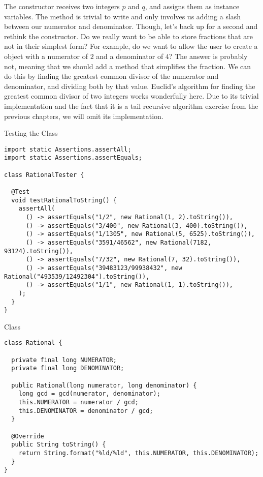 The  constructor receives two integers $p$ and $q$, and assigns them as instance variables. The  method is trivial to write and only involves us adding a slash between our numerator and denominator. Though, let's back up for a second and rethink the constructor. Do we really want to be able to store fractions that are not in their simplest form? For example, do we want to allow the user to create a  object with a numerator of $2$ and a denominator of $4$? The answer is probably not, meaning that we should add a method that simplifies the fraction. We can do this by finding the greatest common divisor of the numerator and denominator, and dividing both by that value. Euclid's algorithm for finding the greatest common divisor of two integers works wonderfully here. Due to its trivial implementation and the fact that it is a tail recursive algorithm exercise from the previous chapters, we will omit its implementation.

\begin{cl}{Testing the  Class}
\begin{lstlisting}[language=MyJava]
import static Assertions.assertAll;
import static Assertions.assertEquals;

class RationalTester {
  
  @Test
  void testRationalToString() {
    assertAll(
      () -> assertEquals("1/2", new Rational(1, 2).toString()),
      () -> assertEquals("3/400", new Rational(3, 400).toString()),
      () -> assertEquals("1/1305", new Rational(5, 6525).toString()),
      () -> assertEquals("3591/46562", new Rational(7182, 93124).toString()),
      () -> assertEquals("7/32", new Rational(7, 32).toString()),
      () -> assertEquals("39483123/99938432", new Rational("493539/12492304").toString()),
      () -> assertEquals("1/1", new Rational(1, 1).toString()),
    );
  }
}
\end{lstlisting}
\end{cl}

\begin{cl}{ Class}
\begin{lstlisting}[language=MyJava]
class Rational {
  
  private final long NUMERATOR;
  private final long DENOMINATOR;

  public Rational(long numerator, long denominator) {
    long gcd = gcd(numerator, denominator);
    this.NUMERATOR = numerator / gcd;
    this.DENOMINATOR = denominator / gcd; 
  }

  @Override
  public String toString() {
    return String.format("%ld/%ld", this.NUMERATOR, this.DENOMINATOR);
  }
}
\end{lstlisting}
\end{cl}


